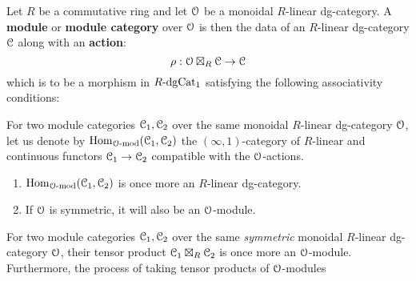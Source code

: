             \begin{definition} \label{def: modules_over_monoidal_dg_categories}
                Let $R$ be a commutative ring and let $\mathcal{O}$ be a monoidal $R$-linear dg-category. A \textbf{module} or \textbf{module category} over $\mathcal{O}$ is then the data of an $R$-linear dg-category $\mathcal{C}$ along with an \textbf{action}:
                    $$\rho: \mathcal{O} \boxtimes_R \mathcal{C} \to \mathcal{C}$$
                which is to be a morphism in $R\text{-}\mathrm{dg}\mathrm{Cat}_1$ satisfying the following associativity conditions:
            \end{definition}
            \begin{lemma} \label{lemma: homomorphisms_between_module_categories}
                For two module categories $\mathcal{C}_1, \mathcal{C}_2$ over the same monoidal $R$-linear dg-category $\mathcal{O}$, let us denote by $\mathrm{Hom}_{\mathcal{O}\text{-}\mathrm{mod}}(\mathcal{C}_1, \mathcal{C}_2)$ the $(\infty, 1)$-category of $R$-linear and continuous functors $\mathcal{C}_1 \to \mathcal{C}_2$ compatible with the $\mathcal{O}$-actions.
                \begin{enumerate}
                    \item $\mathrm{Hom}_{\mathcal{O}\text{-}\mathrm{mod}}(\mathcal{C}_1, \mathcal{C}_2)$ is once more an $R$-linear dg-category.
                    \item If $\mathcal{O}$ is symmetric, it will also be an $\mathcal{O}$-module.
                \end{enumerate}
            \end{lemma}
            \begin{lemma} \label{lemma: tensor_products_of_module_categories}
                For two module categories $\mathcal{C}_1, \mathcal{C}_2$ over the same \textit{symmetric} monoidal $R$-linear dg-category $\mathcal{O}$, their tensor product $\mathcal{C}_1 \boxtimes_R \mathcal{C}_2$ is once more an $\mathcal{O}$-module. Furthermore, the process of taking tensor products of $\mathcal{O}$-modules 
            \end{lemma}
    
    \printbibliography

